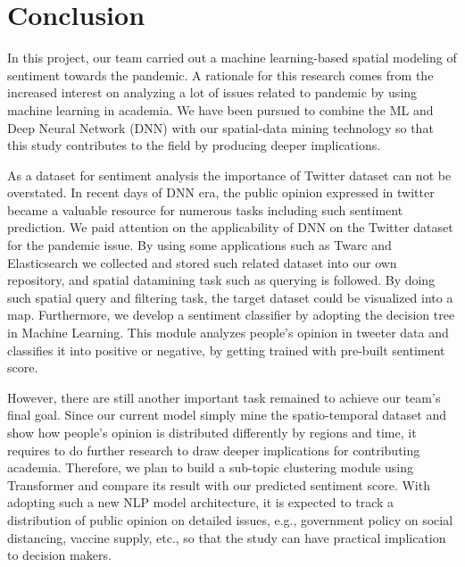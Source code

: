\section{Conclusion}
\label{sec:conclude}
In this project, our team carried out a machine learning-based spatial
modeling of sentiment towards the pandemic. A rationale for this research
comes from the increased interest on analyzing a lot of issues related to
pandemic by using machine learning in academia. We have been pursued to
combine the ML and Deep Neural Network (DNN) with our spatial-data mining
technology so that this study contributes to the field by producing deeper
implications.

As a dataset for sentiment analysis the importance of Twitter dataset can not
be overstated. In recent days of DNN era, the public opinion expressed in
twitter became a valuable resource for numerous tasks including such
sentiment prediction. We paid attention on the applicability of DNN on the
Twitter dataset for the pandemic issue. By using some applications such as
Twarc and Elasticsearch we collected and stored such related dataset into our
own repository, and spatial datamining task such as querying is followed. By
doing such spatial query and filtering task, the target dataset could be
visualized into a map. Furthermore, we develop a sentiment classifier by
adopting the decision tree in Machine Learning. This module analyzes people's
opinion in tweeter data and classifies it into positive or negative, by
getting trained with pre-built sentiment score.

However, there are still another important task remained to achieve our team's
final goal. Since our current model simply mine the spatio-temporal dataset
and show how people's opinion is distributed differently by regions and time,
it requires to do further research to draw deeper implications for
contributing academia. Therefore, we plan to build a sub-topic clustering
module using Transformer and compare its result with our predicted sentiment
score. With adopting such a new NLP model architecture, it is expected to
track a distribution of public opinion on detailed issues, e.g., government
policy on social distancing, vaccine supply, etc., so that the study can have
practical implication to decision makers. 